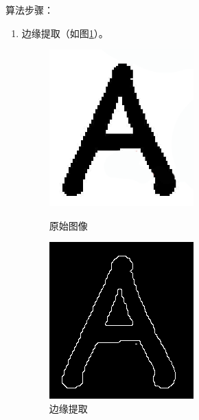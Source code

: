 \documentclass[12pt]{article}
\begin{document}
    {\color{blue}算法步骤}：
    \begin{enumerate}
        \item 边缘提取（如图\ref{fig:edge}）。
           \begin{figure}
            \centering
              \begin{minipage}[t]{0.2\linewidth}
              \centering
              \includegraphics[width=0.6\linewidth]{a1} 
              \caption{原始图像}
              \label{fig:org}
              \end{minipage}
              \begin{minipage}[t]{0.2\linewidth}
              \centering
              \includegraphics[width=0.6\linewidth]{a-edge}
              \caption{边缘提取}
              \label{fig:edge}
              \end{minipage}
              \begin{minipage}[t]{0.2\linewidth}

\end{minipage}
\end{figure}
\end{enumerate}
\end{document}
